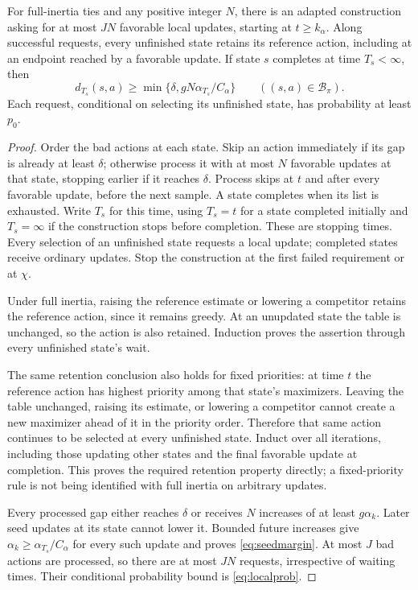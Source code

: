 \begin{lemma}\label{lem:seeds}
For full-inertia ties and any positive integer $N$, there is an adapted construction asking for at most $JN$
favorable local updates, starting at $t\ge k_\alpha$. Along successful requests, every unfinished state
retains its reference action, including at an endpoint reached by a favorable update. If state $s$
completes at time $T_s<\infty$, then
\begin{equation}\label{eq:seedmargin}
d_{T_s}(s,a)\ge\min\{\delta,gN\alpha_{T_s}/C_\alpha\}\qquad((s,a)\in\mathcal B_\pi).
\end{equation}
Each request, conditional on selecting its unfinished state, has probability at least $p_0$.
\end{lemma}
\begin{proof}
Order the bad actions at each state. Skip an action immediately if its gap is already
at least $\delta$; otherwise process it with at most $N$ favorable updates at that state, stopping
earlier if it reaches $\delta$. Process skips at $t$ and after every favorable update, before the next
sample. A state completes when its list is exhausted. Write $T_s$ for this time, using $T_s=t$ for
a state completed initially and $T_s=\infty$ if the construction stops before completion. These
are stopping times. Every selection of an unfinished state requests a local update; completed
states receive ordinary updates. Stop the construction at the first failed requirement or at $\chi$.

Under full inertia, raising the reference estimate or lowering a competitor retains the
reference action, since it remains greedy. At an unupdated state the table is unchanged, so
the action is also retained. Induction proves the assertion through every unfinished state's
wait.

The same retention conclusion also holds for fixed priorities: at time $t$ the reference action has highest priority among that state's
maximizers. Leaving the table unchanged, raising its estimate, or lowering a competitor
cannot create a new maximizer ahead of it in the priority order. Therefore that same action
continues to be selected at every unfinished state. Induct over all iterations, including those
updating other states and the final favorable update at completion. This proves the required
retention property directly; a fixed-priority rule is not being identified with full inertia on
arbitrary updates.

Every processed gap either reaches $\delta$ or receives $N$ increases of at least $g\alpha_k$. Later seed
updates at its state cannot lower it. Bounded future increases give $\alpha_k\ge\alpha_{T_s}/C_\alpha$
for every such update and proves \eqref{eq:seedmargin}. At most $J$ bad actions are processed, so there are
at most $JN$ requests, irrespective of waiting times. Their conditional probability bound is
\eqref{eq:localprob}.
\end{proof}


